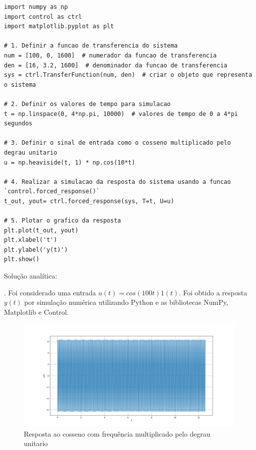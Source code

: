 \documentclass[10pt]{article}
\begin{document}
\begin{lstlisting}
import numpy as np
import control as ctrl
import matplotlib.pyplot as plt

# 1. Definir a funcao de transferencia do sistema
num = [100, 0, 1600]  # numerador da funcao de transferencia
den = [16, 3.2, 1600]  # denominador da funcao de transferencia
sys = ctrl.TransferFunction(num, den)  # criar o objeto que representa o sistema

# 2. Definir os valores de tempo para simulacao
t = np.linspace(0, 4*np.pi, 10000)  # valores de tempo de 0 a 4*pi segundos

# 3. Definir o sinal de entrada como o cosseno multiplicado pelo degrau unitario
u = np.heaviside(t, 1) * np.cos(10*t)

# 4. Realizar a simulacao da resposta do sistema usando a funcao `control.forced_response()`
t_out, yout= ctrl.forced_response(sys, T=t, U=u)

# 5. Plotar o grafico da resposta
plt.plot(t_out, yout)
plt.xlabel('t')
plt.ylabel('y(t)')
plt.show()
\end{lstlisting}

\quad Solução analítica:

\newpage

. Foi considerado uma entrada $u(t) = cos(100 t) 1(t)$. Foi obtido a resposta $y(t)$ por simulação numérica utilizando Python
e as bibliotecas NumPy, Matplotlib e Control.

\begin{figure}[h]
    \centering
    \includegraphics[scale=0.45]{questao4.png}
    \caption{Resposta ao cosseno com frequência multiplicado pelo degrau unitario}
\end{figure}
\end{document}

